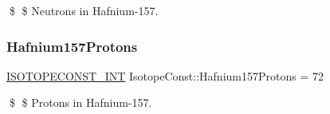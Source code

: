 \$ \$ Neutrons in Hafnium-\/157. \mbox{\label{group___isotope_const-_hafnium-_hf157_ga42deb4c9eaf96e8ef2cc5c06abb8df67}} 
\subsubsection{\texorpdfstring{Hafnium157\+Protons}{Hafnium157Protons}}
{\footnotesize\ttfamily \mbox{\hyperlink{group___isotope_const-_macros_ga5f18360b3e99483a35c32d789e62621c}{I\+S\+O\+T\+O\+P\+E\+C\+O\+N\+S\+T\+\_\+\+I\+NT}} Isotope\+Const\+::\+Hafnium157\+Protons = 72}

\$ \$ Protons in Hafnium-\/157. 